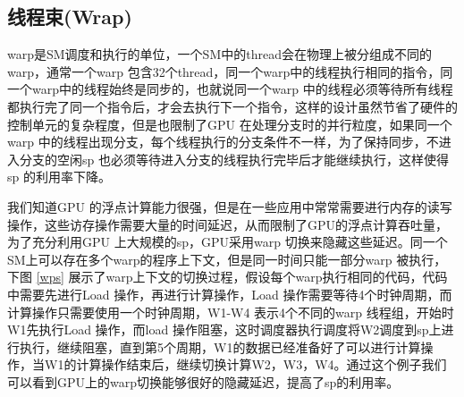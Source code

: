 \subsection{线程束(Wrap)}
warp是SM调度和执行的单位，一个SM中的thread会在物理上被分组成不同的warp，通常一个warp 包含32个thread，同一个warp中的线程执行相同的指令，同一个warp中的线程始终是同步的，也就说同一个warp 中的线程必须等待所有线程都执行完了同一个指令后，才会去执行下一个指令，这样的设计虽然节省了硬件的控制单元的复杂程度，但是也限制了GPU 在处理分支时的并行粒度，如果同一个warp 中的线程出现分支，每个线程执行的分支条件不一样，为了保持同步，不进入分支的空闲sp 也必须等待进入分支的线程执行完毕后才能继续执行，这样使得sp 的利用率下降。

我们知道GPU 的浮点计算能力很强，但是在一些应用中常常需要进行内存的读写操作，这些访存操作需要大量的时间延迟，从而限制了GPU的浮点计算吞吐量，为了充分利用GPU 上大规模的sp，GPU采用warp 切换来隐藏这些延迟。同一个SM上可以存在多个warp的程序上下文，但是同一时间只能一部分warp 被执行，下图 \ref{wps} 展示了warp上下文的切换过程，假设每个warp执行相同的代码，代码中需要先进行Load 操作，再进行计算操作，Load 操作需要等待4个时钟周期，而计算操作只需要使用一个时钟周期，W1-W4 表示4个不同的warp 线程组，开始时W1先执行Load 操作，而load 操作阻塞，这时调度器执行调度将W2调度到sp上进行执行，继续阻塞，直到第5个周期，W1的数据已经准备好了可以进行计算操作，当W1的计算操作结束后，继续切换计算W2，W3，W4。通过这个例子我们可以看到GPU上的warp切换能够很好的隐藏延迟，提高了sp的利用率。

